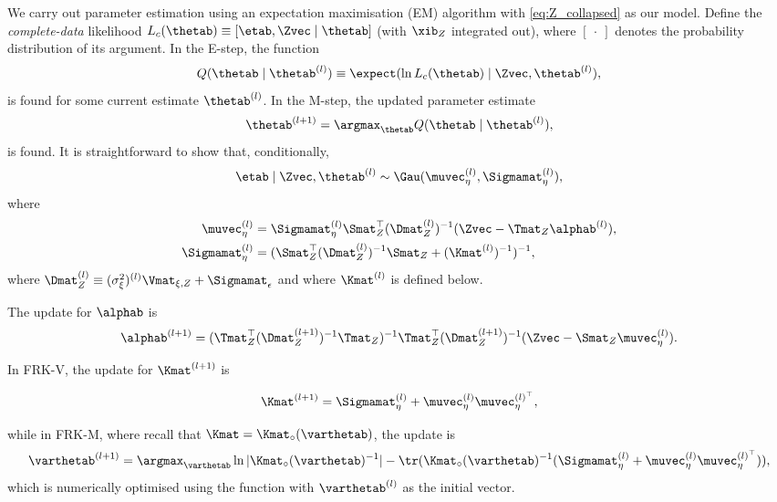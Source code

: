 We carry out parameter estimation using an expectation maximisation (EM) algorithm \citep[similar to][]{Katzfuss_2011,Nguyen_2014} with \eqref{eq:Z_collapsed} as our model. Define the \emph{complete-data} likelihood $L_c(\thetab) \equiv [\etab,\Zvec \mid \thetab]$ (with $\xib_Z$ integrated out), where $[~\cdot~]$ denotes the probability distribution of its argument. In the E-step, the function
\begin{equation*}
Q(\thetab \mid \thetab^{(l)}) \equiv \expect(\ln L_c(\thetab) \mid \Zvec,\thetab^{(l)}),
\end{equation*}
is found for some current estimate $\thetab^{(l)}$. In the M-step, the updated parameter estimate
\begin{equation*}
\thetab^{(l+1)} = \argmax_\thetab Q(\thetab \mid \thetab^{(l)}),
\end{equation*}
is found. It is straightforward to show that, conditionally,
\begin{equation*}
\etab \mid \Zvec,\thetab^{(l)} \sim \Gau(\muvec_\eta^{(l)},\Sigmamat_\eta^{(l)}),
\end{equation*}
where
\begin{align*}
\muvec_\eta^{(l)} &= \Sigmamat_\eta^{(l)} \Smat_Z^\top(\Dmat_Z^{(l)})^{-1}(\Zvec - \Tmat_Z\alphab^{(l)}), \\
\Sigmamat_\eta^{(l)} &= (\Smat_Z^\top(\Dmat_Z^{(l)})^{-1}\Smat_Z + (\Kmat^{(l)})^{-1})^{-1},
\end{align*}
where $\Dmat_Z^{(l)} \equiv (\sigma^2_\xi)^{(l)} \Vmat_{\xi,Z} + \Sigmamat_\epsilon$ and where $\Kmat^{(l)}$ is defined below.

The update for $\alphab$ is
\begin{equation}
\alphab^{(l+1)} = (\Tmat_Z^\top (\Dmat_Z^{(l+1)})^{-1} \Tmat_Z)^{-1}\Tmat_Z^\top(\Dmat_Z^{(l+1)})^{-1}(\Zvec - \Smat_Z \muvec_\eta^{(l)}). \label{eq:alpha}
\end{equation}

In FRK-V, the update for $\Kmat^{(l+1)}$ is

\begin{equation*}
\Kmat^{(l+1)} = \Sigmamat_\eta^{(l)} + \muvec_\eta^{(l)} \muvec_\eta^{(l)^\top},
\end{equation*}

\noindent while in FRK-M, where recall that $\Kmat = \Kmat_\circ(\varthetab)$, the update is
\begin{equation*}
\varthetab^{(l+1)} = \argmax_{\varthetab} \ln| \Kmat_\circ(\varthetab)^{-1}| - \tr(\Kmat_\circ(\varthetab)^{-1}(\Sigmamat_\eta^{(l)} + \muvec_\eta^{(l)} \muvec_\eta^{(l)^\top})),
\end{equation*}
\noindent which is numerically optimised using the function  with $\varthetab^{(l)}$ as the initial vector.

